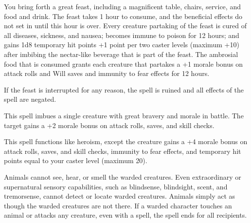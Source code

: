 \begin{multicols}{2}
\begin{small}
\noindent You bring forth a great feast, including a magnificent table, chairs, service, and food and drink. The feast takes 1 hour to consume, and the beneficial effects do not set in until this hour is over. Every creature partaking of the feast is cured of all diseases, sickness, and nausea; becomes immune to poison for 12 hours; and gains 1d8 temporary hit points +1 point per two caster levels (maximum +10) after imbibing the nectar-like beverage that is part of the feast. The ambrosial food that is consumed grants each creature that partakes a +1 morale bonus on attack rolls and Will saves and immunity to fear effects for 12 hours.

\smallskip\noindent If the feast is interrupted for any reason, the spell is ruined and all effects of the spell are negated.

\noindent This spell imbues a single creature with great bravery and morale in battle. The target gains a +2 morale bonus on attack rolls, saves, and skill checks.

\noindent This spell functions like heroism, except the creature gains a +4 morale bonus on attack rolls, saves, and skill checks, immunity to fear effects, and temporary hit points equal to your caster level (maximum 20).

\noindent Animals cannot see, hear, or smell the warded creatures. Even extraordinary or supernatural sensory capabilities, such as blindsense, blindsight, scent, and tremorsense, cannot detect or locate warded creatures. Animals simply act as though the warded creatures are not there. If a warded character touches an animal or attacks any creature, even with a spell, the spell ends for all recipients.


\end{small}
\end{multicols}
